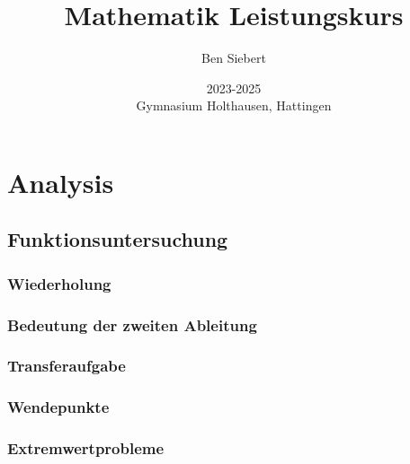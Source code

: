 \documentclass[a4paper,12pt]{report}
\begin{document}
    \bsremovechaptertitle
    \bsremoveparttitle

    \title{Mathematik Leistungskurs}
    \date{
        2023-2025
        \\
        Gymnasium Holthausen, Hattingen
    }
    \author{Ben Siebert}
    \maketitle

    \tableofcontents


    \part{Analysis}


    \chapter{Funktionsuntersuchung}


    \section{Wiederholung}
    


    \section{Bedeutung der zweiten Ableitung}
    
    \section{Transferaufgabe}
    
    \newpage
    \section{Wendepunkte}
    

    \section{Extremwertprobleme}
    
\end{document}
